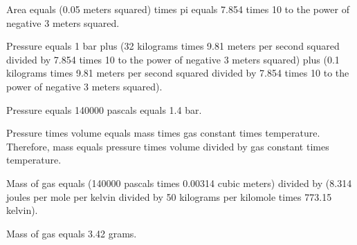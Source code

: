 Area equals (0.05 meters squared) times pi equals 7.854 times 10 to the power of negative 3 meters squared.  

Pressure equals 1 bar plus (32 kilograms times 9.81 meters per second squared divided by 7.854 times 10 to the power of negative 3 meters squared) plus (0.1 kilograms times 9.81 meters per second squared divided by 7.854 times 10 to the power of negative 3 meters squared).  

Pressure equals 140000 pascals equals 1.4 bar.  

Pressure times volume equals mass times gas constant times temperature. Therefore, mass equals pressure times volume divided by gas constant times temperature.  

Mass of gas equals (140000 pascals times 0.00314 cubic meters) divided by (8.314 joules per mole per kelvin divided by 50 kilograms per kilomole times 773.15 kelvin).  

Mass of gas equals 3.42 grams.